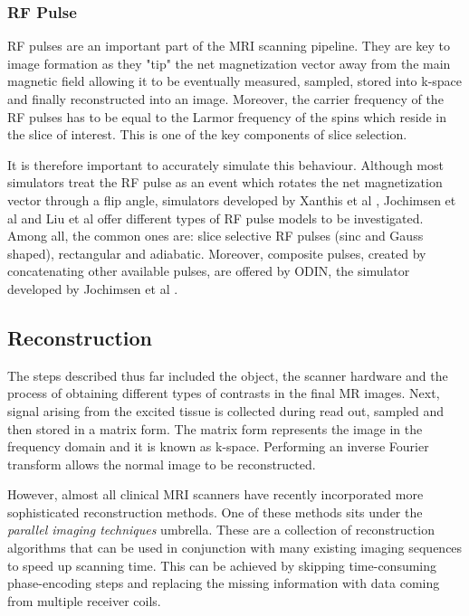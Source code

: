 \subsubsection{RF Pulse}
RF pulses are an important part of the MRI scanning pipeline. They are key to image formation as they "tip" the net magnetization vector away from the main magnetic field allowing it to be eventually measured, sampled, stored into k-space and finally reconstructed into an image. Moreover, the carrier frequency of the RF pulses has to be equal to the Larmor frequency of the spins which reside in the slice of interest. This is one of the key components of slice selection.

It is therefore important to accurately simulate this behaviour. Although most simulators treat the RF pulse as an event which rotates the net magnetization vector through a flip angle, simulators developed by Xanthis et al \cite{Xanthis2014}, Jochimsen et al \cite{Jochimsen2004} and Liu et al \cite{Liu2013} offer different types of RF pulse models to be investigated. Among all, the common ones are: slice selective RF pulses (sinc and Gauss shaped), rectangular and adiabatic. Moreover, composite pulses, created by concatenating other available pulses, are offered by ODIN, the simulator developed by Jochimsen et al \cite{Jochimsen2004}.

\subsection{Reconstruction}
The steps described thus far included the object, the scanner hardware and the process of obtaining different types of contrasts in the final MR images. Next, signal arising from the excited tissue is collected during read out, sampled and then stored in a matrix form. The matrix form represents the image in the frequency domain and it is known as k-space. Performing an inverse Fourier transform allows the normal image to be reconstructed.

However, almost all clinical MRI scanners have recently incorporated more sophisticated reconstruction methods. One of these methods sits under the \textit{parallel imaging techniques} umbrella. These are a collection of reconstruction algorithms that can be used in conjunction with many existing imaging sequences to speed up scanning time. This can be achieved by skipping time-consuming phase-encoding steps and replacing the missing information with data coming from multiple receiver coils. 

